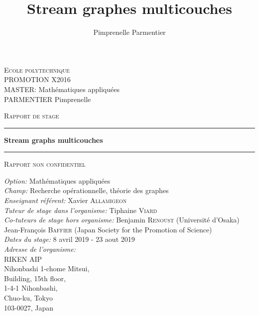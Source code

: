 \documentclass[11pt,a4paper]{article}
\author{Pimprenelle Parmentier}
\title{Stream graphes multicouches}
\theoremstyle{definition}
\theoremstyle{remark}
\theoremstyle{remark}
\def \Stgms {Stream graphs multicouches}
\begin{document}
\begin{titlepage}


\noindent
\textsc{Ecole polytechnique}\\
PROMOTION X2016 \\
MASTER: Mathématiques appliquées\\
PARMENTIER Pimprenelle

\vspace{3cm}
\begin{center}
\textsc{\Large Rapport de stage}
\vspace{1cm}
\hrule %
\vspace{0.4cm}
{\huge \bfseries \Stgms \par}\vspace{0.4cm} %
\hrule 
\vspace{1cm}
\textsc{\Large Rapport non confidentiel}
\vspace{4cm} %
 
\end{center}

\noindent
\textit{Option:} Mathématiques appliquées\\
\textit{Champ:} Recherche opérationnelle, théorie des graphes\\
\textit{Enseignant référent:} Xavier \textsc{Allamigeon}\\
\textit{Tuteur de stage dans l'organisme:} Tiphaine \textsc{Viard}\\
\textit {Co-tuteurs de stage hors organisme:} Benjamin \textsc{Renoust} (Université d'Osaka)\\
\hspace*{3.1cm} Jean-François \textsc{Baffier} (Japan Society for the Promotion of Science)\\
\textit{Dates du stage:} 8 avril 2019 - 23 aout 2019\\
\textit{Adresse de l'organisme:}\\
RIKEN AIP\\
Nihonbashi 1-chome Mitsui,\\
Building, 15th floor,\\
1-4-1 Nihonbashi,\\
Chuo-ku, Tokyo\\
103-0027, Japan\\
\end{titlepage}
\end{document}
